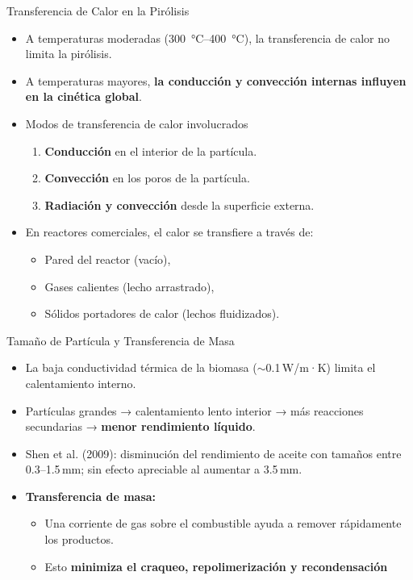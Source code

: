\documentclass[../../main.tex]{subfiles}
\begin{document}
\begin{frame}{Transferencia de Calor en la Pirólisis}
\small
\begin{itemize}
  \item A temperaturas moderadas (\SI{300}{\degreeCelsius}–\SI{400}{\degreeCelsius}), la transferencia de calor no limita la pirólisis.
  \item A temperaturas mayores, \textbf{la conducción y convección internas influyen en la cinética global}.
  \item Modos de transferencia de calor involucrados %
  \begin{enumerate}
    \item \textbf{Conducción} en el interior de la partícula.
    \item \textbf{Convección} en los poros de la partícula.
    \item \textbf{Radiación y convección} desde la superficie externa.
  \end{enumerate}
  \item En reactores comerciales, el calor se transfiere a través de:
  \begin{itemize}
    \item Pared del reactor (vacío),
    \item Gases calientes (lecho arrastrado),
    \item Sólidos portadores de calor (lechos fluidizados).
  \end{itemize}
\end{itemize}
\end{frame}

\begin{frame}{Tamaño de Partícula y Transferencia de Masa}
\small
\begin{itemize}
  \item La baja conductividad térmica de la biomasa ($\sim$0.1 W/m·K) limita el calentamiento interno.
  \item Partículas grandes → calentamiento lento interior → más reacciones secundarias → \textbf{menor rendimiento líquido}.
  \item Shen et al. (2009): disminución del rendimiento de aceite con tamaños entre 0.3–1.5 mm; sin efecto apreciable al aumentar a 3.5 mm.
  \item \textbf{Transferencia de masa:}
  \begin{itemize}
    \item Una corriente de gas sobre el combustible ayuda a remover rápidamente los productos.
    \item Esto \textbf{minimiza el craqueo, repolimerización y recondensación} %
  \end{itemize}
\end{itemize}
\end{frame}
\end{document}
